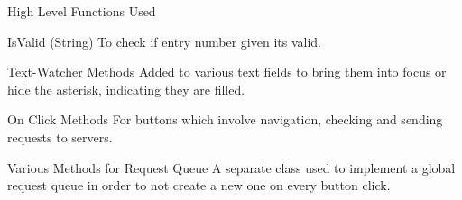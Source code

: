 \documentclass{beamer}
\begin{document}
\begin{frame}{High Level Functions Used }
\begin{block}{IsValid (String)}
To check if entry number given its valid.
\end{block}
\begin{block}{Text-Watcher Methods}
Added to various text fields to bring them into focus or hide the asterisk, indicating they are filled.
\end{block}
\begin{block}{On Click Methods}
For buttons which involve navigation, checking and sending requests to servers.
\end{block}
\begin{block}{Various Methods for Request Queue}
A separate class used to implement a global request queue in order to not create a new one on every button click.
\end{block}


\end{frame}
\end{document}
